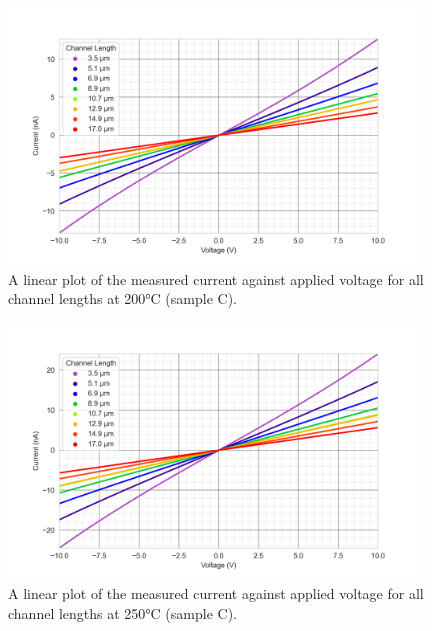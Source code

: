 \begin{figure}[h]
    \centering
    \includegraphics[width=0.97\textwidth]{Chapter3/Figs/Raster/Sample C 2019/IV/10V IV characteristics at 200 C.png}
    \caption{A linear plot of the measured current against applied voltage for all channel lengths at 200\si{\degreeCelsius} (sample C).}
    \label{appfig:C_current_voltage_200}
\end{figure}
\begin{figure}[h]
    \centering
    \includegraphics[width=0.97\textwidth]{Chapter3/Figs/Raster/Sample C 2019/IV/10V IV characteristics at 250 C.png}
    \caption{A linear plot of the measured current against applied voltage for all channel lengths at 250\si{\degreeCelsius} (sample C).}
    \label{appfig:C_current_voltage_250}
\end{figure}

